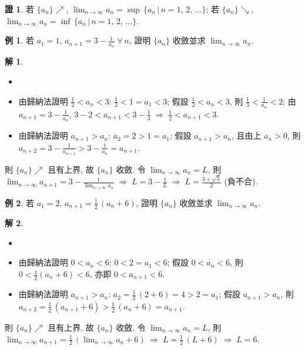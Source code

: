 \documentclass[12pt]{extarticle}
\newcommand{\ds}{\displaystyle}
\newcommand{\ie}{\;\Longrightarrow\;}
\theoremstyle{definition}
\newtheorem*{ex}{例}
\newtheorem*{sol}{解}
\newtheorem*{prf}{證}
\begin{document}
\begin{prf}
  若 $\{a_n\}\nearrow$, $\ds\lim_{n\to\infty}a_n = \sup\,\{a_n\,|\,n = 1,\,2,\,\dots\}$; 若 $\{a_n\}\searrow$, $\ds\lim_{n\to\infty}a_n = \inf\,\{a_n\,|\,n = 1,\,2,\,\dots\}$. 
\end{prf}

\begin{ex}
  若 $a_1 = 1$, $\ds a_{n + 1} = 3 - \frac{1}{a_n}\;\forall\,n$, 證明 $\{a_n\}$ 收斂並求 $\ds\lim_{n\to\infty}a_n$. 
\end{ex}

\begin{sol}
  \begin{itemize}\setlength{\itemsep}{0pt}
    \item[]
    \item 由歸納法證明 $\ds\frac{1}{2} < a_n < 3$: $\ds\frac{1}{2} < 1 = a_1 < 3$; 假設 $\ds\frac{1}{2} < a_n < 3$, 則 $\ds\frac{1}{3} < \frac{1}{a_n} < 2$; 由 $\ds a_{n + 1} = 3 - \frac{1}{a_n}$, $\ds 3 - 2 < a_{n + 1} < 3 - \frac{1}{3} \ie \frac{1}{2} < a_{n + 1} < 3$.   
    \item 由歸納法證明 $a_{n + 1} > a_n$: $\ds a_2 = 2 > 1 = a_1$; 假設 $\ds a_{n + 1} > a_n$, 且由上 $\ds a_n > 0$, 則 $\ds a_{n + 2} = 3 - \frac{1}{a_{n + 1}} > 3 - \frac{1}{a_n} = a_{n + 1}$.   
  \end{itemize}
  則 $\{a_n\}\nearrow$ 且有上界, 故 $\{a_n\}$ 收斂. 令 $\ds\lim_{n\to\infty}a_n = L$, 則 $\ds\lim_{n\to\infty} a_{n + 1} = 3 - \frac{1}{\lim_{n\to\infty} a_n} \ie L = 3 - \frac{1}{L} \ie L = \frac{3+\sqrt{5}}{2}$ (負不合). 
\end{sol}

\begin{ex}
  若 $\ds a_1 = 2$, $\ds a_{n + 1} = \frac{1}{2}\,(a_n + 6)$, 證明 $\{a_n\}$ 收斂並求 $\ds\lim_{n\to\infty}a_n$. 
\end{ex}

\begin{sol}
  \begin{itemize}\setlength{\itemsep}{0pt}
    \item[]
    \item 由歸納法證明 $\ds 0 < a_n < 6$: $\ds 0 < 2 = a_1 < 6$; 假設 $\ds 0 < a_n < 6$, 則 $\ds 0 < \frac{1}{2}(a_n + 6) < 6$, 亦即 $\ds 0 < a_{n + 1} < 6$.  
    \item 由歸納法證明 $a_{n + 1} > a_n$: $\ds a_2 = \frac{1}{2}\,(2 + 6) = 4 > 2 = a_1$; 假設 $\ds a_{n + 1} > a_n$, 則 $\ds a_{n + 2} =\frac{1}{2}\,(a_{n + 1} + 6) > \frac{1}{2}\,(a_n + 6) = a_{n + 1}$.   
  \end{itemize}
  則 $\{a_n\}\nearrow$ 且有上界, 故 $\{a_n\}$ 收斂. 令 $\ds\lim_{n\to\infty}a_n = L$, 則 $\ds\lim_{n\to\infty} a_{n + 1} = \frac{1}{2}\,({\lim_{n\to\infty} a_n} + 6)\ie L = \frac{1}{2}\,(L + 6) \ie L = 6$. 
\end{sol}
\end{document}
